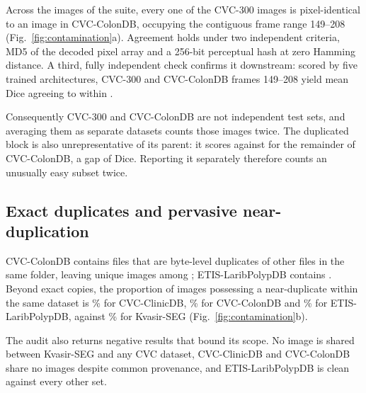 \documentclass[11pt]{article}
\begin{document}
Across the \NimagesTotal{} images of the suite, every one of the
\CVCThreeMatched{} CVC-300 images is pixel-identical to an image in
CVC-ColonDB, occupying the contiguous frame range 149--208
(Fig.~\ref{fig:contamination}a). Agreement holds under two independent
criteria, MD5 of the decoded pixel array and a 256-bit perceptual hash at zero
Hamming distance. A third, fully independent check confirms it downstream:
scored by five trained architectures, CVC-300 and CVC-ColonDB frames
149--208 yield mean Dice agreeing to within \IdentityMaxDiff{}.

Consequently CVC-300 and CVC-ColonDB are not independent test sets, and
averaging them as separate datasets counts those \CVCThreeMatched{} images
twice. The duplicated block is also unrepresentative of its parent: it scores
\BlockDice{} against \RestDice{} for the remainder of CVC-ColonDB, a gap of
\BlockGap{} Dice. Reporting it separately therefore counts an unusually easy
subset twice.

\begin{table}[t]\centering
\caption{\textbf{Image-level audit of the evaluation suite.} Files counts the
images as distributed; Unique counts distinct images by the MD5 digest of the
decoded pixels. Kvasir-Sessile is distributed separately and its images are
drawn from Kvasir-SEG, so it is excluded from suite totals.}
\label{tab:audit}
\small

\end{table}

\subsection*{Exact duplicates and pervasive near-duplication}

CVC-ColonDB contains \NDupesColon{} files that are byte-level duplicates of
other files in the same folder, leaving \NUniqueColon{} unique images among
\NColon{}; ETIS-LaribPolypDB contains \NDupesEtis{}. Beyond exact copies,
the proportion of images possessing a near-duplicate within the same dataset
is \NearDupNinetyClinic\% for CVC-ClinicDB, \NearDupNinetyColon\% for
CVC-ColonDB and \NearDupNinetyEtis\% for ETIS-LaribPolypDB, against
\NearDupNinetyKvasir\% for Kvasir-SEG (Fig.~\ref{fig:contamination}b).

The audit also returns negative results that bound its scope. No image is
shared between Kvasir-SEG and any CVC dataset, CVC-ClinicDB and CVC-ColonDB
share no images despite common provenance, and ETIS-LaribPolypDB is clean
against every other set.
\end{document}
